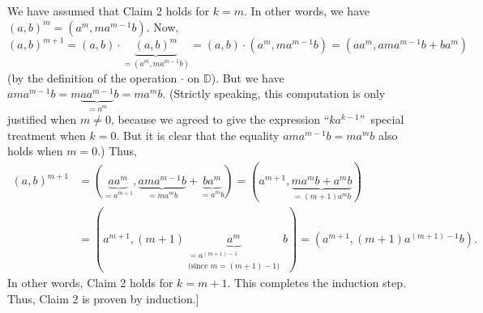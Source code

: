 \documentclass[paper=a4, fontsize=12pt]{scrartcl}%
\theoremstyle{plainsl}
\theoremstyle{definition}
\theoremstyle{remark}
\begin{document}
We have assumed that Claim 2 holds for $k=m$. In other words, we have $\left(
a,b\right)  ^{m}=\left(  a^{m},ma^{m-1}b\right)  $. Now,%
\[
\left(  a,b\right)  ^{m+1}=\left(  a,b\right)  \cdot\underbrace{\left(
a,b\right)  ^{m}}_{=\left(  a^{m},ma^{m-1}b\right)  }=\left(  a,b\right)
\cdot\left(  a^{m},ma^{m-1}b\right)  =\left(  aa^{m},ama^{m-1}b+ba^{m}\right)
\]
(by the definition of the operation $\cdot$ on $\mathbb{D}$). But we have
$ama^{m-1}b=m\underbrace{aa^{m-1}}_{=a^{m}}b=ma^{m}b$. (Strictly speaking,
this computation is only justified when $m\neq0$, because we agreed to give
the expression \textquotedblleft$ka^{k-1}$\textquotedblright\ special
treatment when $k=0$. But it is clear that the equality $ama^{m-1}b=ma^{m}b$
also holds when $m=0$.) Thus,%
\begin{align*}
\left(  a,b\right)  ^{m+1}  &  =\left(  \underbrace{aa^{m}}_{=a^{m+1}%
},\underbrace{ama^{m-1}b}_{=ma^{m}b}+\underbrace{ba^{m}}_{=a^{m}b}\right)
=\left(  a^{m+1},\underbrace{ma^{m}b+a^{m}b}_{=\left(  m+1\right)  a^{m}%
b}\right) \\
&  =\left(  a^{m+1},\left(  m+1\right)  \underbrace{a^{m}}%
_{\substack{=a^{\left(  m+1\right)  -1}\\\text{(since }m=\left(  m+1\right)
-1\text{)}}}b\right)  =\left(  a^{m+1},\left(  m+1\right)  a^{\left(
m+1\right)  -1}b\right)  .
\end{align*}
In other words, Claim 2 holds for $k=m+1$. This completes the induction step.
Thus, Claim 2 is proven by induction.]
\end{document}
